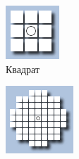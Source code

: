 \begin{figure}[H]
	\centering
	\begin{subfigure}[b]{0.2\textwidth}
		\includegraphics[width=\textwidth]{theory/img/kernel_square}
		\caption{Квадрат}
		\label{fig:kernel_square}
	\end{subfigure}
	\hfill
	\begin{subfigure}[b]{0.2\textwidth}
		\includegraphics[width=\textwidth]{theory/img/kernel_disk}

\end{subfigure}
\end{figure}
